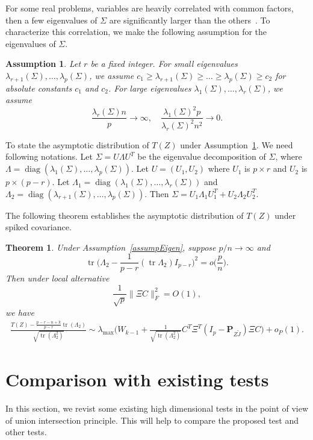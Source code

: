 \documentclass[12pt]{article} %
\DeclareMathOperator{\mytr}{tr}
\DeclareMathOperator{\mydiag}{diag}
\newcommand{\bP}{\mathbf{P}}
\newtheorem{assumption}{Assumption}
\newtheorem{theorem}{Theorem}
\theoremstyle{definition}
\begin{document}
For some real problems, variables are heavily correlated with common factors, then a few eigenvalues of $\Sigma$ are significantly larger than the others~\cite{Ma2015A}.
To characterize this correlation, we make the following assumption for the eigenvalues of $\Sigma$.

\begin{assumption}\label{assumpEigen}
    Let $r$ be a fixed integer.
    For small eigenvalues $\lambda_{r+1}(\Sigma),\ldots,\lambda_p(\Sigma)$, we assume
 $c_1 \geq \lambda_{r+1}(\Sigma) \geq \ldots \geq \lambda_{p}(\Sigma) \geq c_2$ for absolute constants $c_1$ and $c_2$.
    For large eigenvalues $\lambda_1(\Sigma),\ldots,\lambda_r(\Sigma)$,
    we assume 
    $$\frac{\lambda_r(\Sigma) n}{p}\to \infty,\quad
    \frac{\lambda_1(\Sigma)^2 p}{\lambda_r(\Sigma)^2 n^2}\to 0.$$
\end{assumption}


To state the asymptotic distribution of $T(Z)$ under Assumption~\ref{assumpEigen}.
We need following notations.
Let $\Sigma= U\Lambda U^T$ be the eigenvalue decomposition of $\Sigma$, where $\Lambda =\mydiag (\lambda_1(\Sigma),\ldots,\lambda_p(\Sigma))$.
Let $U=(U_1,U_2)$ where $U_1$ is $p\times r$ and $U_2$ is $p\times (p-r)$.
Let $\Lambda_1=\mydiag(\lambda_1(\Sigma),\ldots,\lambda_r(\Sigma))$ and $\Lambda_2=\mydiag(\lambda_{r+1}(\Sigma),\ldots,\lambda_p(\Sigma))$.
Then $\Sigma=U_1\Lambda_1 U_1^T+U_2\Lambda_2 U_2^T$.

The following theorem establishes the asymptotic distribution of $T(Z)$ under spiked covariance.
\begin{theorem}\label{thm1}
    Under Assumption~\eqref{assumpEigen}, suppose $p/n\to \infty$ and
    $$
    \mytr\Big(\Lambda_2-\frac{1}{p-r}(\mytr \Lambda_2)I_{p-r}\Big)^2=o\big(\frac{p}{n}\big).
    $$
    Then under local alternative
    \begin{equation*}
        \frac{1}{\sqrt{p}}\|\Xi C\|_F^2=O(1),
    \end{equation*}
    we have
    $$
    \begin{aligned}
        \frac{T(Z)-\frac{p-r-n+k}{p-r}\mytr(\Lambda_2)}{\sqrt{\mytr (\Lambda_2^2)}}
        \sim
        \lambda_{\max}\Big(W_{k-1}+\tfrac{1}{\sqrt{\mytr(\Lambda_2^2)}} C^T \Xi^T (I_p-\bP_{Z\tilde{J}})\Xi C\Big)
        +o_P(1).
    \end{aligned}
    $$
\end{theorem}

\section{Comparison with existing tests}
\label{sc:compare}
In this section, we revist some existing high dimensional tests in the point of view of union intersection principle.
This will help to compare the proposed test and other tests.
\end{document}
